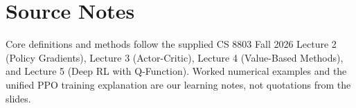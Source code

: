 \section{Source Notes}
Core definitions and methods follow the supplied CS 8803 Fall 2026 Lecture 2 (Policy Gradients), Lecture 3 (Actor-Critic), Lecture 4 (Value-Based Methods), and Lecture 5 (Deep RL with Q-Function). Worked numerical examples and the unified PPO training explanation are our learning notes, not quotations from the slides.
